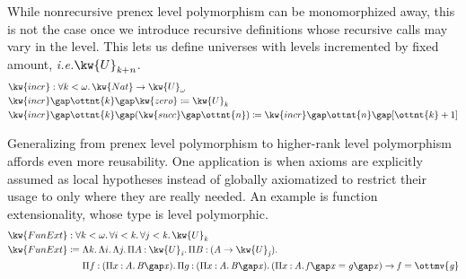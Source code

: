 \documentclass[a4paper,UKenglish,cleveref,autoref,thm-restate]{lipics-v2021}
\makeatletter
\newcommand{\ie}{\textit{i.e.}\@\xspace}
\makeatother
\begin{document}
While nonrecursive prenex level polymorphism can be monomorphized away,
this is not the case once we introduce recursive definitions
whose recursive calls may vary in the level.
This lets us define universes with levels incremented by fixed amount,
\ie $ \kw{U}_{    \mathit{ k }   +   \mathit{ n }    } $.
%
\begin{align*}
  & \kw{ incr }  :   \forall  k  <   \omega   \mathpunct{.}   \kw{ Nat }    \to   \kw{U}_{  \omega  }   \\
  &   \kw{ incr }   \gap  \ottnt{k}   \gap   \kw{ zero }   \coloneqq  \kw{U}_{  \mathit{ k }  }  \\
  &   \kw{ incr }   \gap  \ottnt{k}   \gap   (   \kw{ succ }   \gap  \ottnt{n}  )   \coloneqq    \kw{ incr }   \gap  \ottnt{n}   \gap [   \ottnt{k}  + 1   ] 
\end{align*}

Generalizing from prenex level polymorphism to higher-rank level polymorphism affords even more reusability.
One application is when axioms are explicitly assumed
as local hypotheses instead of globally axiomatized
to restrict their usage to only where they are really needed.
An example is function extensionality,
whose type is level polymorphic.
%
\begin{align*}
   \kw{ FunExt }  &:  \forall  k  <   \omega   \mathpunct{.}   \forall  i  <   \mathit{ k }   \mathpunct{.}   \forall  j  <   \mathit{ k }   \mathpunct{.}   \kw{U}_{  \mathit{ k }  }     \\
   \kw{ FunExt }  &\coloneqq  \Lambda  k  \mathpunct{.}   \Lambda  i  \mathpunct{.}   \Lambda  j  \mathpunct{.}   \Pi  A  \mathbin{:}   \kw{U}_{  \mathit{ i }  }   \mathpunct{.}   \Pi  B  \mathbin{:}   (   \mathit{ A }   \to   \kw{U}_{  \mathit{ j }  }   )   \mathpunct{.}   \relax       \\
  &\phantom{{} \coloneqq {}}   \Pi  f  \mathbin{:}   (   \Pi  x  \mathbin{:}   \mathit{ A }   \mathpunct{.}   \mathit{ B }    \gap   \mathit{ x }   )   \mathpunct{.}   \Pi  g  \mathbin{:}   (   \Pi  x  \mathbin{:}   \mathit{ A }   \mathpunct{.}   \mathit{ B }    \gap   \mathit{ x }   )   \mathpunct{.}   (     \Pi  x  \mathbin{:}   \mathit{ A }   \mathpunct{.}   \mathit{ f }    \gap   \mathit{ x }    =   \mathit{ g }    \gap   \mathit{ x }   )     \to     \mathit{ f }   =   \mathit{ \ottmv{g} }    
\end{align*}
\end{document}
